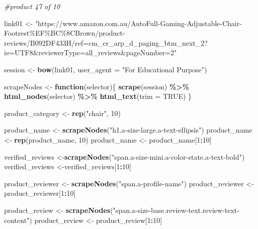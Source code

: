 \documentclass[
]{article}
\newenvironment{Shaded}{\begin{snugshade}}{\end{snugshade}}
\newcommand{\AttributeTok}[1]{\textcolor[rgb]{0.13,0.29,0.53}{#1}}
\newcommand{\CommentTok}[1]{\textcolor[rgb]{0.56,0.35,0.01}{\textit{#1}}}
\newcommand{\ConstantTok}[1]{\textcolor[rgb]{0.56,0.35,0.01}{#1}}
\newcommand{\ControlFlowTok}[1]{\textcolor[rgb]{0.13,0.29,0.53}{\textbf{#1}}}
\newcommand{\DecValTok}[1]{\textcolor[rgb]{0.00,0.00,0.81}{#1}}
\newcommand{\FunctionTok}[1]{\textcolor[rgb]{0.13,0.29,0.53}{\textbf{#1}}}
\newcommand{\NormalTok}[1]{#1}
\newcommand{\OtherTok}[1]{\textcolor[rgb]{0.56,0.35,0.01}{#1}}
\newcommand{\SpecialCharTok}[1]{\textcolor[rgb]{0.81,0.36,0.00}{\textbf{#1}}}
\newcommand{\StringTok}[1]{\textcolor[rgb]{0.31,0.60,0.02}{#1}}
\begin{document}
\begin{Shaded}
\begin{Highlighting}[]
\CommentTok{\#product 47 of 10}

\NormalTok{link01 }\OtherTok{\textless{}{-}} \StringTok{"https://www.amazon.com.au/AutoFull{-}Gaming{-}Adjustable{-}Chair{-}Footrest\%EF\%BC\%8CBrown/product{-}reviews/B092DF433H/ref=cm\_cr\_arp\_d\_paging\_btm\_next\_2?ie=UTF8\&reviewerType=all\_reviews\&pageNumber=2"}


\NormalTok{  session }\OtherTok{\textless{}{-}} \FunctionTok{bow}\NormalTok{(link01,}
               \AttributeTok{user\_agent =} \StringTok{"For Educational Purpose"}\NormalTok{)}

\NormalTok{  scrapeNodes }\OtherTok{\textless{}{-}} \ControlFlowTok{function}\NormalTok{(selector)\{}
    \FunctionTok{scrape}\NormalTok{(session) }\SpecialCharTok{\%\textgreater{}\%}
      \FunctionTok{html\_nodes}\NormalTok{(selector) }\SpecialCharTok{\%\textgreater{}\%}
      \FunctionTok{html\_text}\NormalTok{(}\AttributeTok{trim =} \ConstantTok{TRUE}\NormalTok{)}
\NormalTok{  \}}

\NormalTok{  product\_category }\OtherTok{\textless{}{-}} \FunctionTok{rep}\NormalTok{(}\StringTok{"chair"}\NormalTok{, }\DecValTok{10}\NormalTok{)}

\NormalTok{  product\_name }\OtherTok{\textless{}{-}} \FunctionTok{scrapeNodes}\NormalTok{(}\StringTok{"h1.a{-}size{-}large.a{-}text{-}ellipsis"}\NormalTok{)}
\NormalTok{  product\_name }\OtherTok{\textless{}{-}} \FunctionTok{rep}\NormalTok{(product\_name, }\DecValTok{10}\NormalTok{)}
\NormalTok{  product\_name }\OtherTok{\textless{}{-}}\NormalTok{ product\_name[}\DecValTok{1}\SpecialCharTok{:}\DecValTok{10}\NormalTok{]}
  
\NormalTok{  verified\_reviews }\OtherTok{\textless{}{-}}\FunctionTok{scrapeNodes}\NormalTok{(}\StringTok{"span.a{-}size{-}mini.a{-}color{-}state.a{-}text{-}bold"}\NormalTok{)}
\NormalTok{  verified\_reviews }\OtherTok{\textless{}{-}}\NormalTok{verified\_reviews[}\DecValTok{1}\SpecialCharTok{:}\DecValTok{10}\NormalTok{]}
  
\NormalTok{  product\_reviewer }\OtherTok{\textless{}{-}} \FunctionTok{scrapeNodes}\NormalTok{(}\StringTok{"span.a{-}profile{-}name"}\NormalTok{)}
\NormalTok{  product\_reviewer }\OtherTok{\textless{}{-}}\NormalTok{ product\_reviewer[}\DecValTok{1}\SpecialCharTok{:}\DecValTok{10}\NormalTok{]}
  
\NormalTok{  product\_review }\OtherTok{\textless{}{-}} \FunctionTok{scrapeNodes}\NormalTok{(}\StringTok{"span.a{-}size{-}base.review{-}text.review{-}text{-}content"}\NormalTok{)}
\NormalTok{  product\_review }\OtherTok{\textless{}{-}}\NormalTok{ product\_review[}\DecValTok{1}\SpecialCharTok{:}\DecValTok{10}\NormalTok{]}
  

\end{Highlighting}
\end{Shaded}
\end{document}
